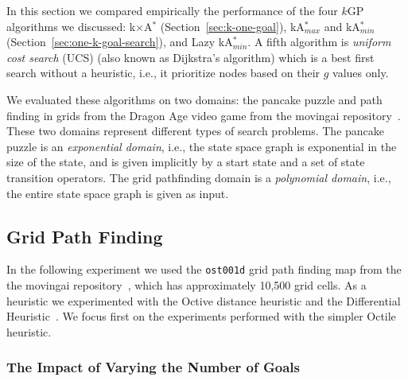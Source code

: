 \documentclass{aicom2e}
\newcommand{\kgs}{$k$GP}
\newcommand{\kastarmin}{kA$^*_{min}$}
\newcommand{\kastarmax}{kA$^*_{max}$}
\newcommand{\kxastar}{k$\times$A$^*$}
\newcommand{\roni}[1]{\textbf{[RS:#1]}}
\begin{document}
In this section we compared empirically the performance of the four \kgs{}
algorithms we discussed: \kxastar{} (Section~\ref{sec:k-one-goal}),
\kastarmax{} and \kastarmin{}(Section~\ref{sec:one-k-goal-search}), and Lazy
\kastarmin{}. A fifth algorithm is {\em uniform cost search} (UCS) (also known
as Dijkstra's algorithm) which is a best first search without a heuristic,
i.e., it prioritize nodes based on their $g$ values only.


We evaluated these algorithms on two domains: the pancake puzzle and path
finding in grids from the Dragon Age video game from the movingai
repository~\cite{sturtevant2012benchmarks}. These two domains represent
different types of search problems. The pancake puzzle is an {\em exponential
domain}, i.e., the state space graph is exponential in the size of the state,
and is given implicitly by a start state and a set of state transition
operators. The grid pathfinding domain is a {\em polynomial domain}, i.e., the
entire state space graph is given as input. %

\subsection{Grid Path Finding}


In the following experiment we used the {\tt ost001d} grid path finding map from the
the movingai repository~\cite{sturtevant2012benchmarks}, which has approximately 10,500 grid cells.
As a heuristic we experimented with the Octive distance heuristic and the Differential Heuristic~\cite{goldberg2005computing,ng2002predicting,sturtevant2009memory}. We focus first on the experiments performed with the simpler Octile heuristic.

\subsubsection{The Impact of Varying the Number of Goals}
\end{document}
